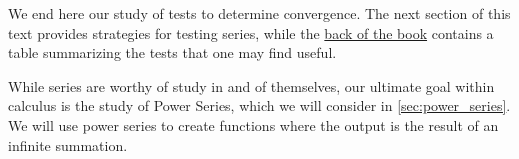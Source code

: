 We end here our study of tests to determine convergence. The next section of this text provides strategies for testing series, while the \hyperref[tab_series_tests]{back of the book} contains a table summarizing the tests that one may find useful. 

While series are worthy of study in and of themselves, our ultimate goal within calculus is the study of Power Series, which we will consider in \autoref{sec:power_series}. We will use power series to create functions where the output is the result of an infinite summation. %

